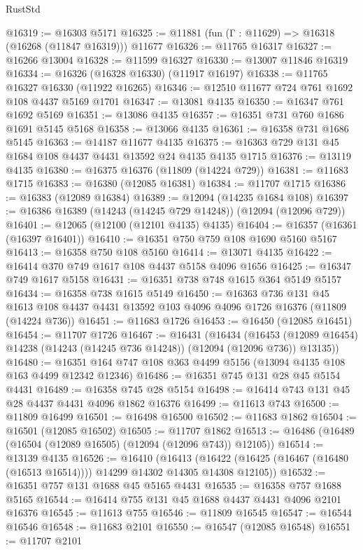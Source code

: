 \begin{lexlean}{RustStd}
\begin{coremodule}
@16319 := @16303 @5171
@16325 := @11881 (fun (Γ : @11629) => @16318 (@16268 (@11847 @16319))) @11677
@16326 := @11765 @16317
@16327 := @16266 @13004
@16328 := @11599 @16327
@16330 := @13007 @11846 @16319
@16334 := @16326 (@16328 @16330) (@11917 @16197)
@16338 := @11765 @16327 @16330 (@11922 @16265)
@16346 := @12510 @11677 @724 @761 @1692 @108 @4437 @5169 @1701
@16347 := @13081 @4135
@16350 := @16347 @761 @1692 @5169
@16351 := @13086 @4135
@16357 := @16351 @731 @760 @1686 @1691 @5145 @5168
@16358 := @13066 @4135
@16361 := @16358 @731 @1686 @5145
@16363 := @14187 @11677 @4135
@16375 := @16363 @729 @131 @45 @1684 @108 @4437 @4431 @13592 @24 @4135 @4135 @1715
@16376 := @13119 @4135
@16380 := @16375 @16376 (@11809 (@14224 @729))
@16381 := @11683 @1715
@16383 := @16380 (@12085 @16381)
@16384 := @11707 @1715
@16386 := @16383 (@12089 @16384)
@16389 := @12094 (@14235 @1684 @108)
@16397 := @16386 @16389 (@14243 (@14245 @729 @14248)) (@12094 (@12096 @729))
@16401 := @12065 (@12100 (@12101 @4135) @4135)
@16404 := @16357 (@16361 (@16397 @16401))
@16410 := @16351 @750 @759 @108 @1690 @5160 @5167
@16413 := @16358 @750 @108 @5160
@16414 := @13071 @4135
@16422 := @16414 @370 @749 @1617 @108 @4437 @5158 @4096 @1656
@16425 := @16347 @749 @1617 @5158
@16431 := @16351 @738 @748 @1615 @364 @5149 @5157
@16434 := @16358 @738 @1615 @5149
@16450 := @16363
    @736
    @131
    @45
    @1613
    @108
    @4437
    @4431
    @13592
    @103
    @4096
    @4096
    @1726
    @16376
    (@11809 (@14224 @736))
@16451 := @11683 @1726
@16453 := @16450 (@12085 @16451)
@16454 := @11707 @1726
@16467 := @16431
    (@16434
      (@16453 (@12089 @16454) @14238 (@14243 (@14245 @736 @14248)) (@12094 (@12096 @736)) @13135))
@16480 := @16351 @164 @747 @108 @363 @4499 @5156 (@13094 @4135 @108 @163 @4499 @12342 @12346)
@16486 := @16351 @745 @131 @28 @45 @5154 @4431
@16489 := @16358 @745 @28 @5154
@16498 := @16414 @743 @131 @45 @28 @4437 @4431 @4096 @1862 @16376
@16499 := @11613 @743
@16500 := @11809 @16499
@16501 := @16498 @16500
@16502 := @11683 @1862
@16504 := @16501 (@12085 @16502)
@16505 := @11707 @1862
@16513 := @16486 (@16489 (@16504 (@12089 @16505) (@12094 (@12096 @743)) @12105))
@16514 := @13139 @4135
@16526 := @16410
    (@16413 (@16422 (@16425 (@16467 (@16480 (@16513 @16514)))) @14299 @14302 @14305 @14308 @12105))
@16532 := @16351 @757 @131 @1688 @45 @5165 @4431
@16535 := @16358 @757 @1688 @5165
@16544 := @16414 @755 @131 @45 @1688 @4437 @4431 @4096 @2101 @16376
@16545 := @11613 @755
@16546 := @11809 @16545
@16547 := @16544 @16546
@16548 := @11683 @2101
@16550 := @16547 (@12085 @16548)
@16551 := @11707 @2101

\end{coremodule}
\end{lexlean}
